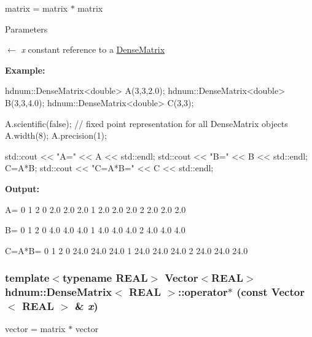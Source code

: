 matrix = matrix $\ast$ matrix 


\begin{DoxyParams}{Parameters}
\item[\mbox{$\leftarrow$} {\em x}]constant reference to a \hyperlink{classhdnum_1_1DenseMatrix}{DenseMatrix}\end{DoxyParams}
{\bfseries Example:} 
\begin{DoxyCode}
  hdnum::DenseMatrix<double> A(3,3,2.0);
  hdnum::DenseMatrix<double> B(3,3,4.0);
  hdnum::DenseMatrix<double> C(3,3);

  A.scientific(false); // fixed point representation for all DenseMatrix objects
  A.width(8);
  A.precision(1);

  std::cout << "A=" << A << std::endl;
  std::cout << "B=" << B << std::endl;
  C=A*B;
  std::cout << "C=A*B=" << C << std::endl;
\end{DoxyCode}


{\bfseries Output:} \begin{DoxyVerb}
A=
                    0        1        2 
          0       2.0      2.0      2.0 
          1       2.0      2.0      2.0 
          2       2.0      2.0      2.0 

B=
                    0        1        2 
          0       4.0      4.0      4.0 
          1       4.0      4.0      4.0 
          2       4.0      4.0      4.0 

C=A*B=
                    0        1        2 
          0      24.0     24.0     24.0 
          1      24.0     24.0     24.0 
          2      24.0     24.0     24.0 
	  \end{DoxyVerb}
 \hypertarget{classhdnum_1_1DenseMatrix_a6c43e793e3c9d91b1c216137a26f9ab7}{
\subsubsection[{operator$\ast$}]{\setlength{\rightskip}{0pt plus 5cm}template$<$typename REAL$>$ {\bf Vector}$<$REAL$>$ {\bf hdnum::DenseMatrix}$<$ REAL $>$::operator$\ast$ (const {\bf Vector}$<$ REAL $>$ \& {\em x})}}
\label{classhdnum_1_1DenseMatrix_a6c43e793e3c9d91b1c216137a26f9ab7}


vector = matrix $\ast$ vector 


